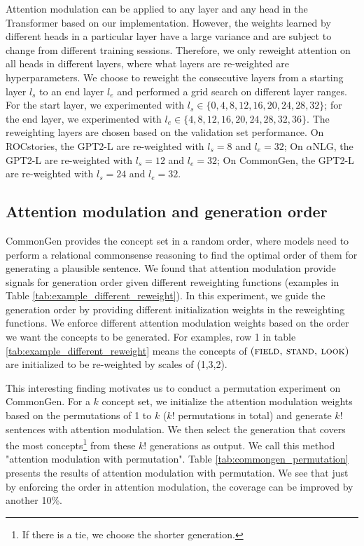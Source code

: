 \documentclass[11pt,a4paper]{article}
\newcommand{\alg}{attention modulation}
\begin{document}
 Attention modulation can be applied to any layer and any head in the Transformer based on our implementation. However, the weights learned by different heads in a particular layer have a large variance \citep{vig-belinkov-2019-analyzing} and are subject to change from different training sessions. Therefore, we only reweight attention on all heads in different layers, where what layers are re-weighted are hyperparameters. We choose to reweight the consecutive layers from a starting layer $l_{s}$ to  an end layer $l_{e}$ and performed a grid search on different layer ranges. For the start layer, we experimented with $l_s \in \{0,4,8,12,16,20,24,28,32\}$; for the end layer, we experimented with $l_e \in \{4,8,12,16,20,24,28,32,36\}$. The reweighting layers are chosen based on the validation set performance. On ROCstories, the GPT2-L are re-weighted with $l_s =8$ and  $l_e =32$; On $\alpha$NLG,  the GPT2-L are re-weighted with $l_s =12$ and  $l_e =32$; On CommonGen, the GPT2-L are re-weighted with $l_s =24$ and  $l_e =32$.
 
 \subsection{Attention modulation and generation order}
 \label{appendix:permutation}
 CommonGen provides the concept set in a random order, where models need to perform a relational commonsense reasoning to find the optimal order of them for generating a plausible sentence. We found that \alg{}  provide signals for generation order given different reweighting functions (examples in Table \ref{tab:example_different_reweight}). In this experiment, we guide the generation order by providing different initialization weights in the reweighting functions. We enforce different \alg{} weights based on the order we want the concepts to be generated.  For examples, row 1 in table \ref{tab:example_different_reweight} means the concepts of $\textsc{(field, stand, look)}$ are initialized to be re-weighted by scales of (1,3,2).

This interesting finding motivates us to conduct a permutation experiment on CommonGen. For a $k$ concept set, we initialize the \alg{} weights based on the permutations of 1 to $k$ ($k$! permutations in total) and generate $k$! sentences with \alg{}. We then select the generation that covers the most concepts\footnote{If there is a tie, we choose the shorter generation.} from these $k$! generations as output. We call this method "\alg{} with permutation". Table \ref{tab:commongen_permutation} presents the results of \alg{} with permutation. %
We see that just by enforcing the order in \alg{}, the coverage can be improved by another 10\%. %
\end{document}
